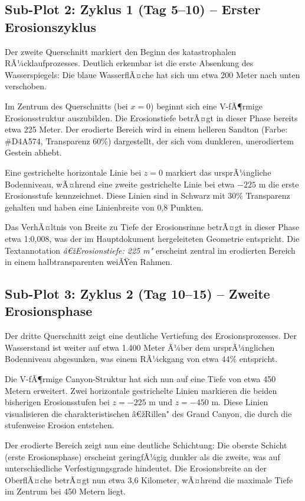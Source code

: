 ﻿\documentclass[12pt,a4paper]{report}
\begin{document}
\subsection{Sub-Plot 2: Zyklus 1 (Tag 5--10) -- Erster Erosionszyklus}

Der zweite Querschnitt markiert den Beginn des katastrophalen RÃ¼cklaufprozesses. Deutlich erkennbar ist die erste Absenkung des Wasserspiegels: Die blaue WasserflÃ¤che hat sich um etwa 200 Meter nach unten verschoben. 

Im Zentrum des Querschnitts (bei $x = 0$) beginnt sich eine V-fÃ¶rmige Erosionsstruktur auszubilden. Die Erosionstiefe betrÃ¤gt in dieser Phase bereits etwa 225 Meter. Der erodierte Bereich wird in einem helleren Sandton (Farbe: \#D4A574, Transparenz 60\%) dargestellt, der sich vom dunkleren, unerodiertem Gestein abhebt.

Eine gestrichelte horizontale Linie bei $z = 0$ markiert das ursprÃ¼ngliche Bodenniveau, wÃ¤hrend eine zweite gestrichelte Linie bei etwa $-225$ m die erste Erosionsstufe kennzeichnet. Diese Linien sind in Schwarz mit 30\% Transparenz gehalten und haben eine Linienbreite von 0,8 Punkten.

Das VerhÃ¤ltnis von Breite zu Tiefe der Erosionsrinne betrÃ¤gt in dieser Phase etwa 1:0,008, was der im Hauptdokument hergeleiteten Geometrie entspricht. Die Textannotation \textit{â€žErosionstiefe: 225 m"} erscheint zentral im erodierten Bereich in einem halbtransparenten weiÃŸen Rahmen.

\subsection{Sub-Plot 3: Zyklus 2 (Tag 10--15) -- Zweite Erosionsphase}

Der dritte Querschnitt zeigt eine deutliche Vertiefung des Erosionsprozesses. Der Wasserstand ist weiter auf etwa 1.400 Meter Ã¼ber dem ursprÃ¼nglichen Bodenniveau abgesunken, was einem RÃ¼ckgang von etwa 44\% entspricht.

Die V-fÃ¶rmige Canyon-Struktur hat sich nun auf eine Tiefe von etwa 450 Metern erweitert. Zwei horizontale gestrichelte Linien markieren die beiden bisherigen Erosionsstufen bei $z = -225$ m und $z = -450$ m. Diese Linien visualisieren die charakteristischen â€žRillen" des Grand Canyon, die durch die stufenweise Erosion entstehen.

Der erodierte Bereich zeigt nun eine deutliche Schichtung: Die oberste Schicht (erste Erosionsphase) erscheint geringfÃ¼gig dunkler als die zweite, was auf unterschiedliche Verfestigungsgrade hindeutet. Die Erosionsbreite an der OberflÃ¤che betrÃ¤gt nun etwa 3,6 Kilometer, wÃ¤hrend die maximale Tiefe im Zentrum bei 450 Metern liegt.
\end{document}
